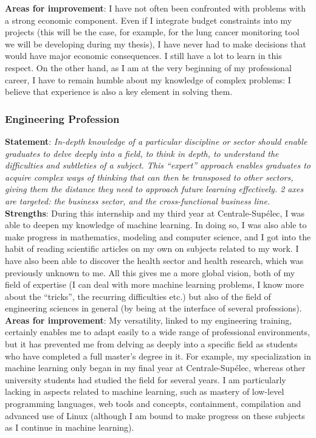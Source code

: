 \documentclass[preprint,12pt]{elsarticle}
\begin{document}
\noindent \textbf{Areas for improvement}: I have not often been confronted with problems with a strong economic component. Even if I integrate budget constraints into my projects (this will be the case, for example, for the lung cancer monitoring tool we will be developing during my thesis), I have never had to make decisions that would have major economic consequences. I still have a lot to learn in this respect. On the other hand, as I am at the very beginning of my professional career, I have to remain humble about my knowledge of complex problems: I believe that experience is also a key element in solving them.

\subsubsection{Engineering Profession}

\noindent \textbf{Statement}: \textit{In-depth knowledge of a particular discipline or sector should enable graduates to delve deeply into a field, to think in depth, to understand the difficulties and subtleties of a subject. This “expert” approach enables graduates to acquire complex ways of thinking that can then be transposed to other sectors, giving them the distance they need to approach future learning effectively. 2 axes are targeted: the business sector, and the cross-functional business line.}\\[3 pt]

\noindent \textbf{Strengths}: During this internship and my third year at Centrale-Supélec, I was able to deepen my knowledge of machine learning. In doing so, I was also able to make progress in mathematics, modeling and computer science, and I got into the habit of reading scientific articles on my own on subjects related to my work. I have also been able to discover the health sector and health research, which was previously unknown to me. All this gives me a more global vision, both of my field of expertise (I can deal with more machine learning problems, I know more about the “tricks”, the recurring difficulties etc.) but also of the field of engineering sciences in general (by being at the interface of several professions).\\[3 pt]

\noindent \textbf{Areas for improvement}: My versatility, linked to my engineering training, certainly enables me to adapt easily to a wide range of professional environments, but it has prevented me from delving as deeply into a specific field as students who have completed a full master's degree in it. For example, my specialization in machine learning only began in my final year at Centrale-Supélec, whereas other university students had studied the field for several years. I am particularly lacking in aspects related to machine learning, such as mastery of low-level programming languages, web tools and concepts, containment, compilation and advanced use of Linux (although I am bound to make progress on these subjects as I continue in machine learning).
\end{document}
